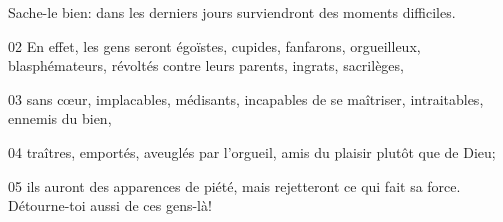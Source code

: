 Sache-le bien: dans les derniers jours surviendront des moments difficiles.

02 En effet, les gens seront égoïstes, cupides, fanfarons, orgueilleux, blasphémateurs, révoltés contre leurs parents, ingrats, sacrilèges,

03 sans cœur, implacables, médisants, incapables de se maîtriser, intraitables, ennemis du bien,

04 traîtres, emportés, aveuglés par l’orgueil, amis du plaisir plutôt que de Dieu;

05 ils auront des apparences de piété, mais rejetteront ce qui fait sa force. Détourne-toi aussi de ces gens-là!
